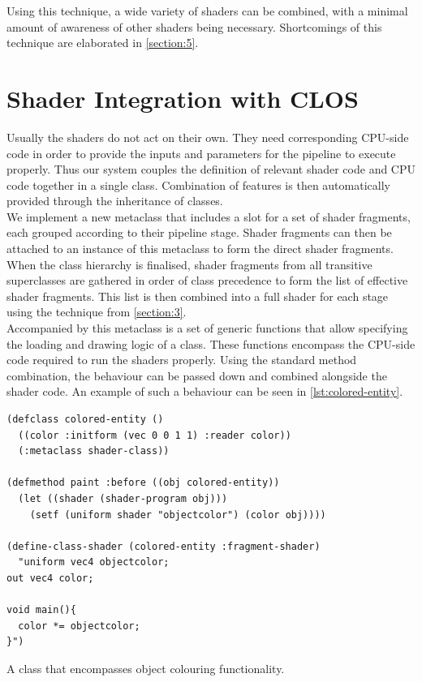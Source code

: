 \documentclass{sig-alternate}
\begin{document}
Using this technique, a wide variety of shaders can be combined, with a minimal amount of awareness of other shaders being necessary. Shortcomings of this technique are elaborated in \autoref{section:5}.

\section{Shader Integration with CLOS}\label{section:4}
Usually the shaders do not act on their own. They need corresponding CPU-side code in order to provide the inputs and parameters for the pipeline to execute properly. Thus our system couples the definition of relevant shader code and CPU code together in a single class. Combination of features is then automatically provided through the inheritance of classes. \\

We implement a new metaclass that includes a slot for a set of shader fragments, each grouped according to their pipeline stage. Shader fragments can then be attached to an instance of this metaclass to form the direct shader fragments. When the class hierarchy is finalised, shader fragments from all transitive superclasses are gathered in order of class precedence to form the list of effective shader fragments. This list is then combined into a full shader for each stage using the technique from \autoref{section:3}. \\

Accompanied by this metaclass is a set of generic functions that allow specifying the loading and drawing logic of a class. These functions encompass the CPU-side code required to run the shaders properly. Using the standard method combination, the behaviour can be passed down and combined alongside the shader code. An example of such a behaviour can be seen in \autoref{lst:colored-entity}.\\

\begin{listing}[h]
\begin{verbatim}
(defclass colored-entity ()
  ((color :initform (vec 0 0 1 1) :reader color))
  (:metaclass shader-class))

(defmethod paint :before ((obj colored-entity))
  (let ((shader (shader-program obj)))
    (setf (uniform shader "objectcolor") (color obj))))

(define-class-shader (colored-entity :fragment-shader)
  "uniform vec4 objectcolor;
out vec4 color;

void main(){
  color *= objectcolor;
}")
\end{verbatim}
\caption{A  class that encompasses object colouring functionality.}
\label{lst:colored-entity}
\end{listing}
\end{document}
